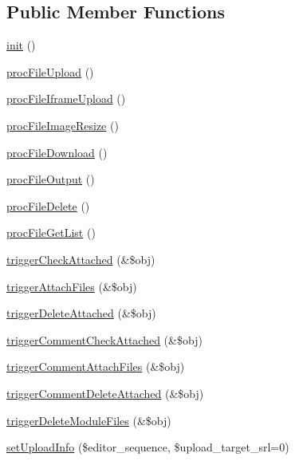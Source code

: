 \subsection*{Public Member Functions}
\begin{DoxyCompactItemize}
\item 
\hyperlink{classfileController_aea1086732740ff005a00f7152e30937d}{init} ()
\item 
\hyperlink{classfileController_a149fa7253922771172674963f700c2d6}{proc\+File\+Upload} ()
\item 
\hyperlink{classfileController_a423c909fc5841f83d9a965839180aad5}{proc\+File\+Iframe\+Upload} ()
\item 
\hyperlink{classfileController_a29e461f3cb7a84ddbb07b0abcdeef2e5}{proc\+File\+Image\+Resize} ()
\item 
\hyperlink{classfileController_a11ac8c819e791e103ed113b3927975af}{proc\+File\+Download} ()
\item 
\hyperlink{classfileController_a21d4fb5d44f6f078cc9d63b89e642dce}{proc\+File\+Output} ()
\item 
\hyperlink{classfileController_a05eff5de98e487cd806ae8fd1229d5dd}{proc\+File\+Delete} ()
\item 
\hyperlink{classfileController_ad1cdb6696de4e0c90532412bb80a359e}{proc\+File\+Get\+List} ()
\item 
\hyperlink{classfileController_ab23c495b5b662264a1c7adfda86f715f}{trigger\+Check\+Attached} (\&\$obj)
\item 
\hyperlink{classfileController_a307bc7f83988451603a052ed77db3895}{trigger\+Attach\+Files} (\&\$obj)
\item 
\hyperlink{classfileController_aaa8d73e09e5aa3a5a6807dffb578d84c}{trigger\+Delete\+Attached} (\&\$obj)
\item 
\hyperlink{classfileController_a6076133ce2b8d0c025c54547fbc9cc37}{trigger\+Comment\+Check\+Attached} (\&\$obj)
\item 
\hyperlink{classfileController_ab25a513258ef9c9e2dc2af274c9c24e7}{trigger\+Comment\+Attach\+Files} (\&\$obj)
\item 
\hyperlink{classfileController_ae1011288af2b3a2aca5bc4db41b9ad09}{trigger\+Comment\+Delete\+Attached} (\&\$obj)
\item 
\hyperlink{classfileController_a68fbf2cdcb182912d4138f269904a1ba}{trigger\+Delete\+Module\+Files} (\&\$obj)
\item 
\hyperlink{classfileController_a5cffda3cff8207351a7bd55065176c69}{set\+Upload\+Info} (\$editor\+\_\+sequence, \$upload\+\_\+target\+\_\+srl=0)

\end{DoxyCompactItemize}
